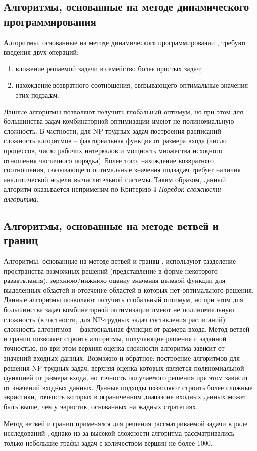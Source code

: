 \documentclass{article}
\begin{document}
\subsection{Алгоритмы, основанные на методе динамического программирования}
Алгоритмы, основанные на методе динамического программировании \cite{Bellman_1966}, требуют введения двух операций:
\begin{enumerate}
  \item вложение решаемой задачи в семейство более простых задач;
  \item нахождение возвратного соотношения, связывающего оптимальные значения этих подзадач.
\end{enumerate}
Данные алгоритмы позволяют получить глобальный оптимум, но при этом для большинства задач комбинаторной оптимизации имеют не полиномиальную сложность. В частности, для NP-трудных задач построения расписаний \cite{Held_Karp_1962} сложность алгоритмов – факториальная функция от размера входа (число процессов, число рабочих интервалов и мощность множества исходного отношения частичного порядка). Более того, нахождение возвратного соотношения, связывающего оптимальные значения подзадач требует наличия аналитической модели вычислительной системы. Таким образом, данный алгоритм оказывается неприменим по Критерию 4 \textit{Порядок сложности алгоритма}.

\subsection{Алгоритмы, основанные на методе ветвей и границ}
Алгоритмы, основанные на методе ветвей и границ \cite{Lawler_Wood_1966}, используют разделение пространства возможных решений (представление в форме некоторого разветвления), верхнюю/нижнюю оценку значения целевой функции для выделенных областей и отсечение областей в которых нет оптимального решения. Данные алгоритмы позволяют получить глобальный оптимум, но при этом для большинства задач комбинаторной оптимизации имеют не полиномиальную сложность (в частности, для NP-трудных задач составления расписаний) сложность алгоритмов – факториальная функция от размера входа. Метод ветвей и границ позволяет строить алгоритмы, получающие решения с заданной точностью, но при этом верхняя оценка сложности алгоритма зависит от значений входных данных. Возможно и обратное: построение алгоритмов для решения NP-трудных задач, верхняя оценка которых является полиномиальной функцией от размера входа, но точность получаемого решения при этом зависит от значений входных данных. Данные подходы позволяют строить более сложные эвристики, точность которых в ограниченном диапазоне входных данных может быть выше, чем у эвристик, основанных на жадных стратегиях.\par
Метод ветвей и границ применялся для решения рассматриваемой задачи в ряде исследований \cite{Kasahara_1984, Kramer_1997, Fujita_2011}, однако из-за высокой сложности алгоритма рассматривались только небольшие графы задач с количеством вершин не более 1000.
\end{document}
